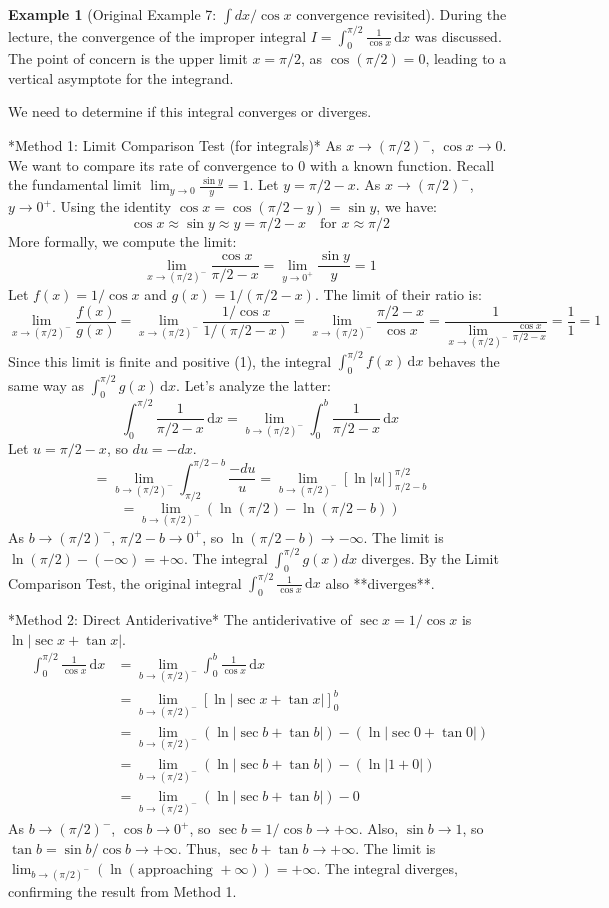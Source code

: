 \documentclass[11pt, letterpaper]{article}
\theoremstyle{plain} %
\theoremstyle{definition} %
\newtheorem{example}[theorem]{Example} %
\theoremstyle{remark} %
\newcommand{\dx}{\,\mathrm{d}x} %
\begin{document}
\begin{example}[Original Example 7: $\int dx / \cos x$ convergence revisited]
During the lecture, the convergence of the improper integral $I = \int_0^{\pi/2} \frac{1}{\cos x} \dx$ was discussed. The point of concern is the upper limit $x = \pi/2$, as $\cos(\pi/2) = 0$, leading to a vertical asymptote for the integrand.

We need to determine if this integral converges or diverges.

*Method 1: Limit Comparison Test (for integrals)*
As $x \to (\pi/2)^-$, $\cos x \to 0$. We want to compare its rate of convergence to 0 with a known function. Recall the fundamental limit $\lim_{y \to 0} \frac{\sin y}{y} = 1$. Let $y = \pi/2 - x$. As $x \to (\pi/2)^-$, $y \to 0^+$. Using the identity $\cos x = \cos(\pi/2 - y) = \sin y$, we have:
\[ \cos x \approx \sin y \approx y = \pi/2 - x \quad \text{for } x \approx \pi/2 \]
More formally, we compute the limit:
\[ \lim_{x \to (\pi/2)^-} \frac{\cos x}{\pi/2 - x} = \lim_{y \to 0^+} \frac{\sin y}{y} = 1 \]
Let $f(x) = 1/\cos x$ and $g(x) = 1/(\pi/2 - x)$. The limit of their ratio is:
\[ \lim_{x \to (\pi/2)^-} \frac{f(x)}{g(x)} = \lim_{x \to (\pi/2)^-} \frac{1/\cos x}{1/(\pi/2 - x)} = \lim_{x \to (\pi/2)^-} \frac{\pi/2 - x}{\cos x} = \frac{1}{\lim_{x \to (\pi/2)^-} \frac{\cos x}{\pi/2 - x}} = \frac{1}{1} = 1 \]
Since this limit is finite and positive (1), the integral $\int_0^{\pi/2} f(x) \dx$ behaves the same way as $\int_0^{\pi/2} g(x) \dx$. Let's analyze the latter:
\[ \int_0^{\pi/2} \frac{1}{\pi/2 - x} \dx = \lim_{b \to (\pi/2)^-} \int_0^b \frac{1}{\pi/2 - x} \dx \]
Let $u = \pi/2 - x$, so $du = -dx$.
\[ = \lim_{b \to (\pi/2)^-} \int_{\pi/2}^{\pi/2 - b} \frac{-du}{u} = \lim_{b \to (\pi/2)^-} [\ln|u|]_{\pi/2 - b}^{\pi/2} \]
\[ = \lim_{b \to (\pi/2)^-} (\ln(\pi/2) - \ln(\pi/2 - b)) \]
As $b \to (\pi/2)^-$, $\pi/2 - b \to 0^+$, so $\ln(\pi/2 - b) \to -\infty$. The limit is $\ln(\pi/2) - (-\infty) = +\infty$.
The integral $\int_0^{\pi/2} g(x) dx$ diverges.
By the Limit Comparison Test, the original integral $\int_0^{\pi/2} \frac{1}{\cos x} \dx$ also **diverges**.

*Method 2: Direct Antiderivative*
The antiderivative of $\sec x = 1/\cos x$ is $\ln|\sec x + \tan x|$.
\begin{align*} \int_0^{\pi/2} \frac{1}{\cos x} \dx &= \lim_{b \to (\pi/2)^-} \int_0^b \frac{1}{\cos x} \dx \\ &= \lim_{b \to (\pi/2)^-} [\ln|\sec x + \tan x|]_0^b \\ &= \lim_{b \to (\pi/2)^-} (\ln|\sec b + \tan b|) - (\ln|\sec 0 + \tan 0|) \\ &= \lim_{b \to (\pi/2)^-} (\ln|\sec b + \tan b|) - (\ln|1 + 0|) \\ &= \lim_{b \to (\pi/2)^-} (\ln|\sec b + \tan b|) - 0 \end{align*}
As $b \to (\pi/2)^-$, $\cos b \to 0^+$, so $\sec b = 1/\cos b \to +\infty$. Also, $\sin b \to 1$, so $\tan b = \sin b / \cos b \to +\infty$.
Thus, $\sec b + \tan b \to +\infty$.
The limit is $\lim_{b \to (\pi/2)^-} (\ln(\text{approaching } +\infty)) = +\infty$.
The integral diverges, confirming the result from Method 1.
\end{example}
\end{document}
